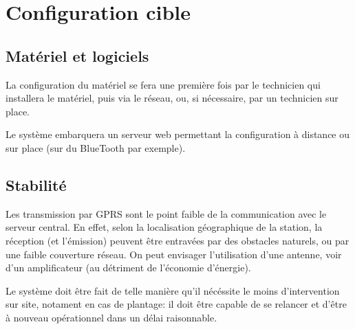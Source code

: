 
\section{Configuration cible}

    \subsection{Matériel et logiciels}
        La configuration du matériel se fera une première fois
        par le technicien qui installera le matériel, puis via le
        réseau, ou, si nécessaire, par un technicien sur place.
        
        Le système embarquera un serveur web permettant la configuration
        à distance ou sur place (sur du BlueTooth par exemple). 

    \subsection{Stabilité}
        Les transmission par GPRS sont le point faible de la
        communication avec le serveur central. En effet, selon la
        localisation géographique de la station, la réception (et
        l'émission) peuvent être entravées par des obstacles naturels,
        ou par une faible couverture réseau. On peut envisager
        l'utilisation d'une antenne, voir d'un amplificateur (au
        détriment de l'économie d'énergie).

        Le système doit être fait de telle manière qu'il nécéssite le
        moins d'intervention sur site, notament en cas de plantage:
        il doit être capable de se relancer et d'être à nouveau
        opérationnel dans un délai raisonnable.

